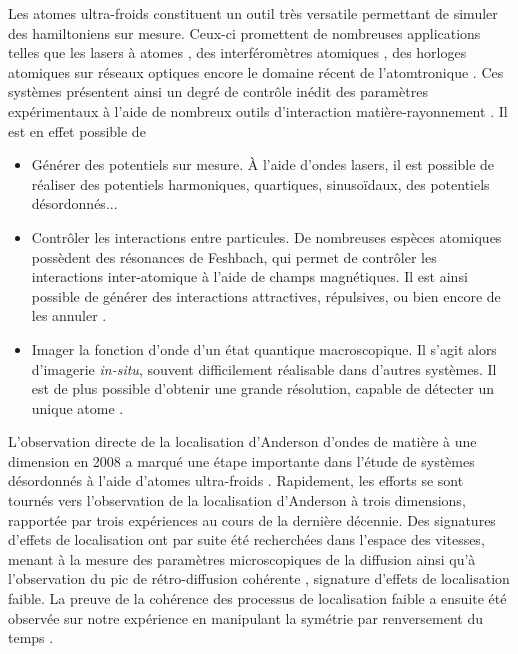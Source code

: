 Les atomes ultra-froids constituent un outil très versatile permettant de simuler des hamiltoniens sur mesure. Ceux-ci promettent de nombreuses applications telles que les lasers à atomes \citep{robins2013atom}, des interféromètres atomiques \citep{canuel2014matter}, des horloges atomiques sur réseaux optiques \citep{derevianko2011colloquium} encore le domaine récent de l'atomtronique \citep{eckel2014hysteresis}. Ces systèmes présentent ainsi un degré de contrôle inédit des paramètres expérimentaux à l'aide de nombreux outils d'interaction matière-rayonnement \citep{bloch2012quantum}. Il est en effet possible de
\begin{itemize}
\item[\textendash] Générer des potentiels sur mesure. À l'aide d'ondes lasers, il est possible de réaliser des potentiels harmoniques, quartiques, sinusoïdaux, des potentiels désordonnés...
\item[\textendash] Contrôler les interactions entre particules. De nombreuses espèces atomiques possèdent des résonances de Feshbach, qui permet de contrôler les interactions inter-atomique à l'aide de champs magnétiques. Il est ainsi possible de générer des interactions attractives, répulsives, ou bien encore de les annuler \citep{walraven2010elements}.
\item[\textendash] Imager la fonction d'onde d'un état quantique macroscopique. Il s'agit alors d'imagerie \emph{in-situ}, souvent difficilement réalisable dans d'autres systèmes. Il est de plus possible d'obtenir une grande résolution, capable de détecter un unique atome \citep{ott2016single}.
\end{itemize}



L'observation directe de la localisation d'Anderson d'ondes de matière à une dimension en 2008 a marqué une étape importante dans l'étude de systèmes désordonnés à l'aide d'atomes ultra-froids \citep{roati2008anderson}\citep{billy2008direct}. Rapidement, les efforts se sont tournés vers l'observation de la localisation d'Anderson à trois dimensions, rapportée par trois expériences \citep{kondov2011three}\citep{jendrzejewski2012three}\citep{semeghini2015measurement} au cours de la dernière décennie. Des signatures d'effets de localisation ont par suite été recherchées dans l'espace des vitesses, menant à la mesure des paramètres microscopiques de la diffusion \citep{richard2019elastic} ainsi qu'à l'observation du pic de rétro-diffusion cohérente \citep{jendrzejewski2012coherent}, signature d'effets de localisation faible. La preuve de la cohérence des processus de localisation faible a ensuite été observée sur notre expérience en manipulant la symétrie par renversement du temps \citep{muller2015suppression}. 

